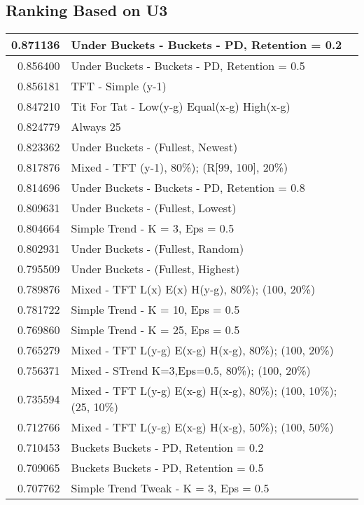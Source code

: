 \begin{table}[!hbtp]
\subsection{Ranking Based on U3}
\begin{footnotesize}
\begin{tabular}{|r|l|}\hline  \label{U3results}
0.871136 & Under Buckets - Buckets - PD, Retention = 0.2\\ \hline
0.856400 & Under Buckets - Buckets - PD, Retention = 0.5\\ \hline
0.856181 & TFT - Simple (y-1)\\ \hline
0.847210 & Tit For Tat - Low(y-g) Equal(x-g) High(x-g)\\ \hline
0.824779 & Always 25\\ \hline
0.823362 & Under Buckets - (Fullest, Newest)\\ \hline
0.817876 & Mixed - {TFT (y-1), 80\%); (R[99, 100], 20\%)}\\ \hline
0.814696 & Under Buckets - Buckets - PD, Retention = 0.8\\ \hline
0.809631 & Under Buckets - (Fullest, Lowest)\\ \hline
0.804664 & Simple Trend - K = 3, Eps = 0.5\\ \hline
0.802931 & Under Buckets - (Fullest, Random)\\ \hline
0.795509 & Under Buckets - (Fullest, Highest)\\ \hline
0.789876 & Mixed - {TFT L(x) E(x) H(y-g), 80\%); (100, 20\%)}\\ \hline
0.781722 & Simple Trend - K = 10, Eps = 0.5\\ \hline
0.769860 & Simple Trend - K = 25, Eps = 0.5\\ \hline
0.765279 & Mixed - {TFT L(y-g) E(x-g) H(x-g), 80\%); (100, 20\%)}\\ \hline
0.756371 & Mixed - {STrend K=3,Eps=0.5, 80\%); (100, 20\%)}\\ \hline
0.735594 & Mixed - {TFT L(y-g) E(x-g) H(x-g), 80\%); (100, 10\%); (25, 10\%)}\\ \hline
0.712766 & Mixed - {TFT L(y-g) E(x-g) H(x-g), 50\%); (100, 50\%)}\\ \hline
0.710453 & Buckets Buckets - PD, Retention = 0.2\\ \hline
0.709065 & Buckets Buckets - PD, Retention = 0.5\\ \hline
0.707762 & Simple Trend Tweak - K = 3, Eps = 0.5\\ \hline

\end{tabular}
\end{footnotesize}
\end{table}
